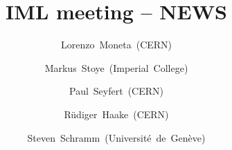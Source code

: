 \author[~]{Lorenzo~Moneta~(CERN)\and
 Markus~Stoye~(Imperial~College)\and
 Paul~Seyfert~(CERN)\and
 Rüdiger~Haake~(CERN)\and
 Steven~Schramm~(Université~de~Genève)}
\institute[CERN]{}
\date[\today]{}
\title{IML meeting -- NEWS}
